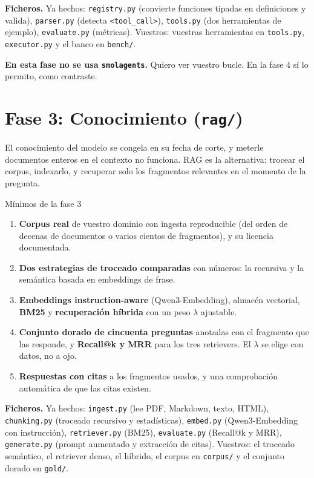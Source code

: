 \documentclass[11pt,a4paper]{article}
\newcommand{\code}[1]{{\small\texttt{#1}}}
\newcommand{\file}[1]{{\small\texttt{\textcolor{arcablue}{#1}}}}
\begin{document}
\textbf{Ficheros.} Ya hechos: \file{registry.py} (convierte funciones tipadas en definiciones
y valida), \file{parser.py} (detecta \code{<tool\_call>}), \file{tools.py} (dos herramientas
de ejemplo), \file{evaluate.py} (métricas). Vuestros: vuestras herramientas en
\file{tools.py}, \file{executor.py} y el banco en \file{bench/}.

\textbf{En esta fase no se usa \code{smolagents}.} Quiero ver vuestro bucle. En la fase 4 sí
lo permito, como contraste.

\section{Fase 3: Conocimiento (\file{rag/})}

El conocimiento del modelo se congela en su fecha de corte, y meterle documentos enteros en el
contexto no funciona. RAG es la alternativa: trocear el corpus, indexarlo, y recuperar solo
los fragmentos relevantes en el momento de la pregunta.

\begin{minimos}{Mínimos de la fase 3}
\begin{enumerate}
  \item \textbf{Corpus real} de vuestro dominio con ingesta reproducible (del orden de
  decenas de documentos o varios cientos de fragmentos), y su licencia documentada.
  \item \textbf{Dos estrategias de troceado comparadas} con números: la recursiva y la
  semántica basada en embeddings de frase.
  \item \textbf{Embeddings instruction-aware} (Qwen3-Embedding), almacén vectorial,
  \textbf{BM25} y \textbf{recuperación híbrida} con un peso $\lambda$ ajustable.
  \item \textbf{Conjunto dorado de cincuenta preguntas} anotadas con el fragmento que las
  responde, y \textbf{Recall@k y MRR} para los tres retrievers. El $\lambda$ se elige con
  datos, no a ojo.
  \item \textbf{Respuestas con citas} a los fragmentos usados, y una comprobación automática
  de que las citas existen.
\end{enumerate}
\end{minimos}

\textbf{Ficheros.} Ya hechos: \file{ingest.py} (lee PDF, Markdown, texto, HTML),
\file{chunking.py} (troceado recursivo y estadísticas), \file{embed.py} (Qwen3-Embedding con
instrucción), \file{retriever.py} (BM25), \file{evaluate.py} (Recall@k y MRR),
\file{generate.py} (prompt aumentado y extracción de citas). Vuestros: el troceado semántico,
el retriever denso, el híbrido, el corpus en \file{corpus/} y el conjunto dorado en
\file{gold/}.
\end{document}
